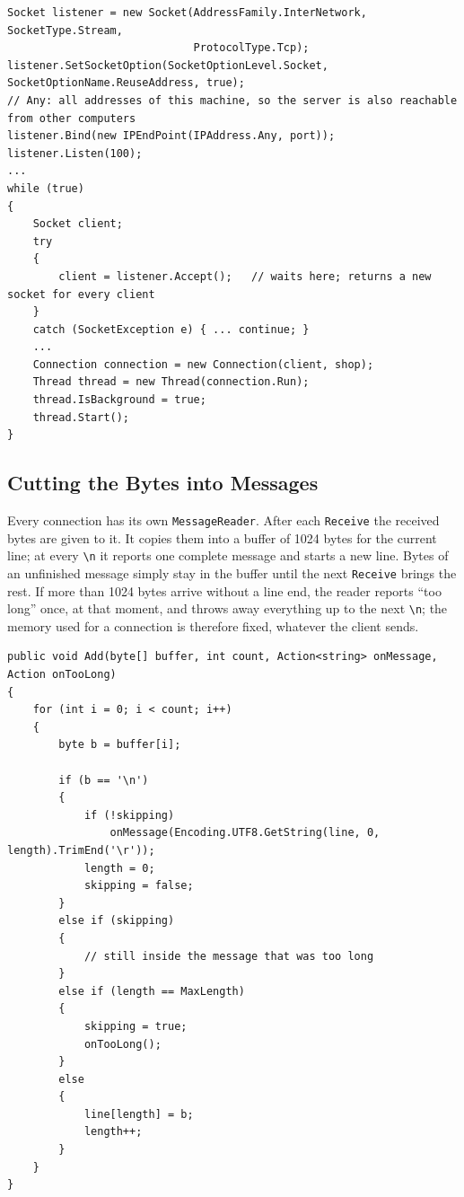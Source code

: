\documentclass[12pt,a4paper]{article}
\begin{document}
\begin{lstlisting}[style=csharp,caption={The listening socket and the accept loop (Server.cs)}]
Socket listener = new Socket(AddressFamily.InterNetwork, SocketType.Stream,
                             ProtocolType.Tcp);
listener.SetSocketOption(SocketOptionLevel.Socket, SocketOptionName.ReuseAddress, true);
// Any: all addresses of this machine, so the server is also reachable from other computers
listener.Bind(new IPEndPoint(IPAddress.Any, port));
listener.Listen(100);
...
while (true)
{
    Socket client;
    try
    {
        client = listener.Accept();   // waits here; returns a new socket for every client
    }
    catch (SocketException e) { ... continue; }
    ...
    Connection connection = new Connection(client, shop);
    Thread thread = new Thread(connection.Run);
    thread.IsBackground = true;
    thread.Start();
}
\end{lstlisting}

\subsection{Cutting the Bytes into Messages}

Every connection has its own \texttt{MessageReader}. After each \texttt{Receive} the received bytes are given to it. It copies them into a buffer of 1024 bytes for the current line; at every \texttt{\textbackslash n} it reports one complete message and starts a new line. Bytes of an unfinished message simply stay in the buffer until the next \texttt{Receive} brings the rest. If more than 1024 bytes arrive without a line end, the reader reports ``too long'' once, at that moment, and throws away everything up to the next \texttt{\textbackslash n}; the memory used for a connection is therefore fixed, whatever the client sends.

\begin{lstlisting}[style=csharp,caption={MessageReader.Add}]
public void Add(byte[] buffer, int count, Action<string> onMessage, Action onTooLong)
{
    for (int i = 0; i < count; i++)
    {
        byte b = buffer[i];

        if (b == '\n')
        {
            if (!skipping)
                onMessage(Encoding.UTF8.GetString(line, 0, length).TrimEnd('\r'));
            length = 0;
            skipping = false;
        }
        else if (skipping)
        {
            // still inside the message that was too long
        }
        else if (length == MaxLength)
        {
            skipping = true;
            onTooLong();
        }
        else
        {
            line[length] = b;
            length++;
        }
    }
}
\end{lstlisting}
\end{document}
